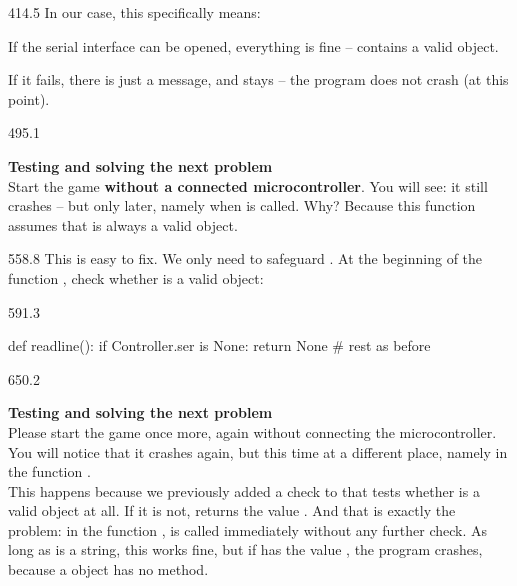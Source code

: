 \documentclass{aslab}
\begin{document}
\begin{region}[x=74.7,right=0,pitch=13.28]{414.5}
In our case, this specifically means:
\begin{dotlist}
\item If the serial interface can be opened, everything is fine --
   contains a valid object.
\item If it fails, there is just a message, and  stays
   -- the program does not crash (at this point).
\end{dotlist}
\end{region}

\begin{region}[pitch=13.8]{495.1}
\begin{tasks}[start=2]
\item \textbf{Testing and solving the next problem}\\
  Start the game \textbf{without a connected microcontroller}. You will see:
  it still crashes -- but only later, namely when  is
  called. Why? Because this function assumes that  is
  always a valid object.
\end{tasks}
\end{region}

\begin{region}[x=74.7,right=0,pitch=13.5]{558.8}
This is easy to fix. We only need to safeguard . At the
beginning of the function , check whether
 is a valid object:
\end{region}

\begin{region}[x=74.7,right=0,pitch=13.2]{591.3}
\begin{codeblock}
def readline():
    if Controller.ser is None:
        return None
    # rest as before
\end{codeblock}
\end{region}

\begin{region}[pitch=13.5]{650.2}
\begin{tasks}[start=3]
\item \textbf{Testing and solving the next problem}\\
  Please start the game once more, again without connecting the
  microcontroller. You will notice that it crashes again, but this time at a
  different place, namely in the function .\\
  This happens because we previously added a check to  that
  tests whether  is a valid object at all. If it is
  not,  returns the value . And that is exactly
  the problem: in the function ,  is called
  immediately without any further check. As long as  is a string,
  this works fine, but if  has the value , the program
  crashes, because a  object has no  method.
\end{tasks}
\end{region}
\end{document}
